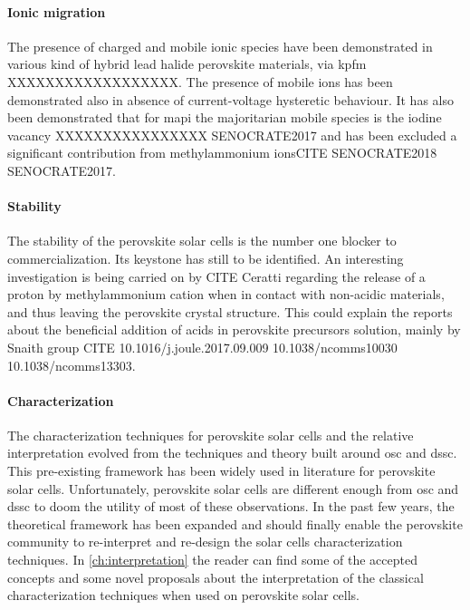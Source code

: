 \paragraph{Ionic migration}

The presence of charged and mobile ionic species have been demonstrated in various kind of hybrid lead halide perovskite materials, via \gls{kpfm}\cite{Birkhold2018} XXXXXXXXXXXXXXXXXX. The presence of mobile ions has been demonstrated also in absence of current-voltage hysteretic behaviour\cite{Calado2016,Jacobs2018}. It has also been demonstrated that for \gls{mapi} the majoritarian mobile species is the iodine vacancy XXXXXXXXXXXXXXXX SENOCRATE2017 and has been excluded a significant contribution from methylammonium ionsCITE SENOCRATE2018 SENOCRATE2017.

\paragraph{Stability}
The stability of the perovskite solar cells is the number one blocker to commercialization. Its keystone has still to be identified. An interesting investigation is being carried on by CITE Ceratti regarding the release of a proton by methylammonium cation when in contact with non-acidic materials, and thus leaving the perovskite crystal structure. This could explain the reports about the beneficial addition of acids in perovskite precursors solution, mainly by Snaith group CITE 10.1016/j.joule.2017.09.009 10.1038/ncomms10030 10.1038/ncomms13303.

\paragraph{Characterization}

The characterization techniques for perovskite solar cells and the relative interpretation evolved from the techniques and theory built around \gls{osc} and \gls{dssc}. This pre-existing framework has been widely used in literature for perovskite solar cells. Unfortunately, perovskite solar cells are different enough from \gls{osc} and \gls{dssc} to doom the utility of most of these observations. In the past few years, the theoretical framework has been expanded and should finally enable the perovskite community to re-interpret and re-design the solar cells characterization techniques. In \cref{ch:interpretation} the reader can find some of the accepted concepts and some novel proposals about the interpretation of the classical characterization techniques when used on perovskite solar cells.

